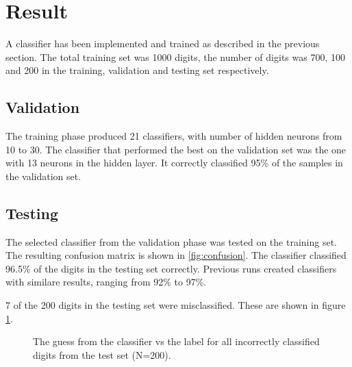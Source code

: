 \documentclass[report.tex]{subfile}
\begin{document}
\section{Result}
A classifier has been implemented and trained as described in the previous
section. The total training set was 1000 digits, the number of digits was 700,
100 and 200 in the training, validation and testing set respectively.

\subsection{Validation}
The training phase produced 21 classifiers, with number of hidden neurons from
10 to 30. The classifier that performed the best on the validation set was the
one with 13 neurons in the hidden layer. It correctly classified 95\% of the
samples in the validation set.

\subsection{Testing}
The selected classifier from the validation phase was tested on the training
set. The resulting confusion matrix is shown in \ref{fig:confusion}. The
classifier classified 96.5\% of the digits in the testing set correctly.
Previous runs created classifiers with similare results, ranging from 92\% to
97\%.

7 of the 200 digits in the testing set were misclassified. These are shown in
figure \ref{fig:incorrect}.

\begin{figure}
    \hspace*{-2cm}
    \resizebox{1.2\textwidth}{!}{}
    \caption{The guess from the classifier vs the label for all incorrectly
    classified digits from the test set (N=200).}
    \label{fig:incorrect}
\end{figure}
\end{document}
